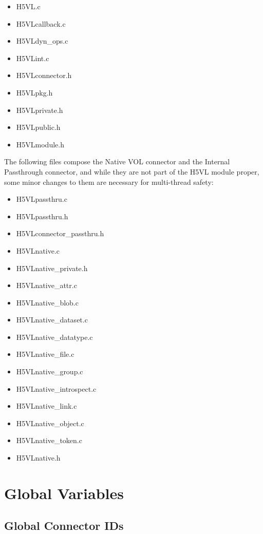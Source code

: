 \documentclass{article}
\begin{document}
\begin{itemize}
    \item H5VL.c
    \item H5VLcallback.c
    \item H5VLdyn\_ops.c
    \item H5VLint.c
    \item H5VLconnector.h
    \item H5VLpkg.h
    \item H5VLprivate.h
    \item H5VLpublic.h
    \item H5VLmodule.h
\end{itemize}

The following files compose the Native VOL connector and the Internal Passthrough connector, and while they are not part of the H5VL module proper, some minor changes to them are necessary for multi-thread safety:
\begin{itemize}
    \item H5VLpassthru.c
    \item H5VLpassthru.h
    \item H5VLconnector\_passthru.h

    \item H5VLnative.c
    \item H5VLnative\_private.h
    \item H5VLnative\_attr.c
    \item H5VLnative\_blob.c
    \item H5VLnative\_dataset.c
    \item H5VLnative\_datatype.c
    \item H5VLnative\_file.c
    \item H5VLnative\_group.c
    \item H5VLnative\_introspect.c
    \item H5VLnative\_link.c
    \item H5VLnative\_object.c
    \item H5VLnative\_token.c
    \item H5VLnative.h
\end{itemize}

\section{Global Variables}
\subsection{Global Connector IDs}
\end{document}
